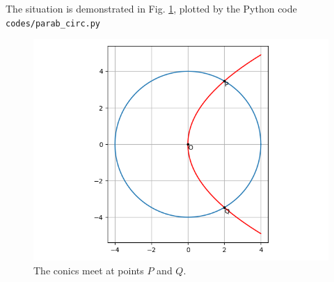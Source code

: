 \documentclass[journal,12pt,twocolumn]{IEEEtran}
\begin{document}
\begin{enumerate}
    The situation is demonstrated in Fig. \ref{fig:parab-circ}, plotted by the 
    Python code \texttt{codes/parab\_circ.py}
    \begin{figure}[!ht]
        \centering
        \includegraphics[width=\columnwidth]{figs/parab_circ.png}
        \caption{The conics meet at points $P$ and $Q$.}
        \label{fig:parab-circ}
    \end{figure}
\end{enumerate}
\end{document}
